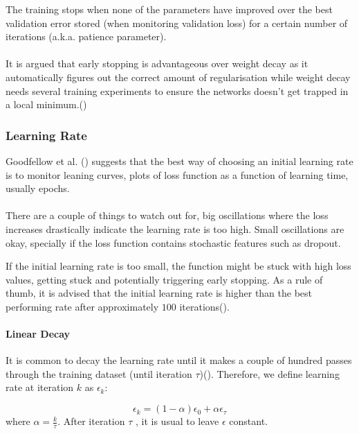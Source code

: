 The training stops when none of the parameters have improved over the best validation error stored (when monitoring validation loss) for a certain number of iterations (\gls{a.k.a.} patience parameter).
\paragraph{}
It is argued that early stopping is advantageous over weight decay as it automatically figures out the correct amount of regularisation while weight decay needs several training experiments to ensure the networks doesn't get trapped in a local minimum.(\cite{GoodBengCour16}) 

\subsubsection{Learning Rate} \label{learning_rate}
Goodfellow et al. (\cite{GoodBengCour16}) suggests that the best way of choosing an initial learning rate is to monitor leaning curves, plots of loss function as a function of learning time, usually epochs. 
\paragraph{}
There are a couple of things to watch out for, big oscillations  where the loss increases drastically indicate the learning rate is too high. Small oscillations are okay, specially if the loss function contains stochastic features such as dropout. 

If the initial learning rate is too small, the function might be stuck with high loss values, getting stuck and potentially triggering early stopping. As a rule of thumb, it is advised that the initial learning rate is higher than the best performing rate after approximately $100$ iterations(\cite{GoodBengCour16}).

\paragraph{Linear Decay} 
It is common to decay the learning rate until it makes a couple of hundred passes through the training dataset (until iteration $\tau$)(\cite{GoodBengCour16}). Therefore, we define learning rate at iteration $k$ as $\epsilon_k$:

\begin{equation} \label{eq_linear_lr}
\epsilon_k = (1 - \alpha)\epsilon_0 + \alpha\epsilon_\tau
\end{equation}
where $\alpha=\frac{k}{\tau}$. After iteration $\tau$ , it is usual to leave $\epsilon$ constant.

